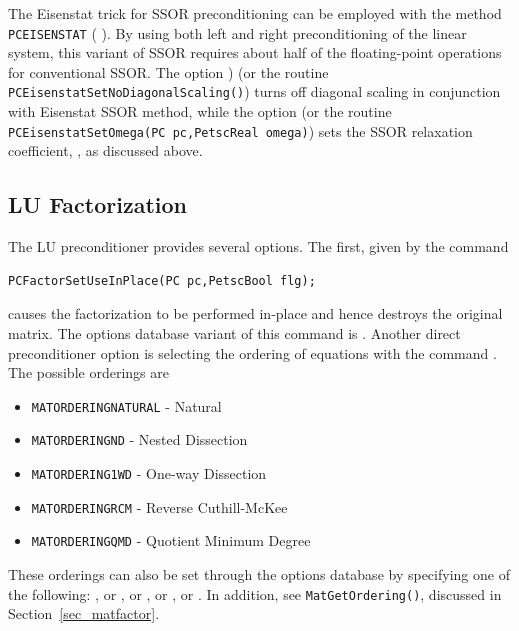 The Eisenstat trick \cite{eisenstat81}  for SSOR preconditioning
can be employed with the method \lstinline{PCEISENSTAT}
( ).
By using both left and right preconditioning of the linear system,
this variant of SSOR requires about half of the floating-point operations
for conventional SSOR. The option
)
(or the routine \lstinline{PCEisenstatSetNoDiagonalScaling()})
turns off diagonal scaling in conjunction with Eisenstat SSOR method, while
the option  (or the routine
\lstinline{PCEisenstatSetOmega(PC pc,PetscReal omega)})
sets the SSOR relaxation coefficient, , as discussed above.

\subsection{LU Factorization}
\label{sec_factorization}

The LU preconditioner provides several options.  The first, given by
the 
command  
\begin{lstlisting}
PCFactorSetUseInPlace(PC pc,PetscBool flg);
\end{lstlisting}
causes the factorization to be performed in-place and hence
destroys the original matrix.  The options database variant of
this command is . 
Another direct preconditioner option is selecting the ordering
of equations with the command  
   .
The possible orderings are
\begin{itemize}
\item \lstinline{MATORDERINGNATURAL} - Natural
\item \lstinline{MATORDERINGND} - Nested Dissection
\item \lstinline{MATORDERING1WD} - One-way Dissection
\item \lstinline{MATORDERINGRCM} - Reverse Cuthill-McKee
\item \lstinline{MATORDERINGQMD} - Quotient Minimum Degree
\end{itemize}
  
  
 
 
These orderings can also be set through the options database by specifying
one of the following:   , or , or  , or , or .
In addition, see \lstinline{MatGetOrdering()}, discussed in Section~\ref{sec_matfactor}.

